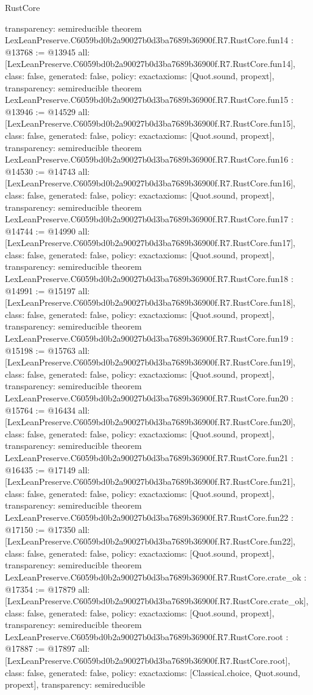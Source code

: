 \begin{lexlean}{RustCore}
\begin{coremodule}
{  transparency: semireducible
}
theorem LexLeanPreserve.C6059bd0b2a90027b0d3ba7689b36900f.R7.RustCore.fun14 : @13768 := @13945 {
  all: [LexLeanPreserve.C6059bd0b2a90027b0d3ba7689b36900f.R7.RustCore.fun14],
  class: false,
  generated: false,
  policy: exact{axioms: [Quot.sound, propext]},
  transparency: semireducible
}
theorem LexLeanPreserve.C6059bd0b2a90027b0d3ba7689b36900f.R7.RustCore.fun15 : @13946 := @14529 {
  all: [LexLeanPreserve.C6059bd0b2a90027b0d3ba7689b36900f.R7.RustCore.fun15],
  class: false,
  generated: false,
  policy: exact{axioms: [Quot.sound, propext]},
  transparency: semireducible
}
theorem LexLeanPreserve.C6059bd0b2a90027b0d3ba7689b36900f.R7.RustCore.fun16 : @14530 := @14743 {
  all: [LexLeanPreserve.C6059bd0b2a90027b0d3ba7689b36900f.R7.RustCore.fun16],
  class: false,
  generated: false,
  policy: exact{axioms: [Quot.sound, propext]},
  transparency: semireducible
}
theorem LexLeanPreserve.C6059bd0b2a90027b0d3ba7689b36900f.R7.RustCore.fun17 : @14744 := @14990 {
  all: [LexLeanPreserve.C6059bd0b2a90027b0d3ba7689b36900f.R7.RustCore.fun17],
  class: false,
  generated: false,
  policy: exact{axioms: [Quot.sound, propext]},
  transparency: semireducible
}
theorem LexLeanPreserve.C6059bd0b2a90027b0d3ba7689b36900f.R7.RustCore.fun18 : @14991 := @15197 {
  all: [LexLeanPreserve.C6059bd0b2a90027b0d3ba7689b36900f.R7.RustCore.fun18],
  class: false,
  generated: false,
  policy: exact{axioms: [Quot.sound, propext]},
  transparency: semireducible
}
theorem LexLeanPreserve.C6059bd0b2a90027b0d3ba7689b36900f.R7.RustCore.fun19 : @15198 := @15763 {
  all: [LexLeanPreserve.C6059bd0b2a90027b0d3ba7689b36900f.R7.RustCore.fun19],
  class: false,
  generated: false,
  policy: exact{axioms: [Quot.sound, propext]},
  transparency: semireducible
}
theorem LexLeanPreserve.C6059bd0b2a90027b0d3ba7689b36900f.R7.RustCore.fun20 : @15764 := @16434 {
  all: [LexLeanPreserve.C6059bd0b2a90027b0d3ba7689b36900f.R7.RustCore.fun20],
  class: false,
  generated: false,
  policy: exact{axioms: [Quot.sound, propext]},
  transparency: semireducible
}
theorem LexLeanPreserve.C6059bd0b2a90027b0d3ba7689b36900f.R7.RustCore.fun21 : @16435 := @17149 {
  all: [LexLeanPreserve.C6059bd0b2a90027b0d3ba7689b36900f.R7.RustCore.fun21],
  class: false,
  generated: false,
  policy: exact{axioms: [Quot.sound, propext]},
  transparency: semireducible
}
theorem LexLeanPreserve.C6059bd0b2a90027b0d3ba7689b36900f.R7.RustCore.fun22 : @17150 := @17350 {
  all: [LexLeanPreserve.C6059bd0b2a90027b0d3ba7689b36900f.R7.RustCore.fun22],
  class: false,
  generated: false,
  policy: exact{axioms: [Quot.sound, propext]},
  transparency: semireducible
}
theorem LexLeanPreserve.C6059bd0b2a90027b0d3ba7689b36900f.R7.RustCore.crate_ok : @17354 := @17879 {
  all: [LexLeanPreserve.C6059bd0b2a90027b0d3ba7689b36900f.R7.RustCore.crate_ok],
  class: false,
  generated: false,
  policy: exact{axioms: [Quot.sound, propext]},
  transparency: semireducible
}
theorem LexLeanPreserve.C6059bd0b2a90027b0d3ba7689b36900f.R7.RustCore.root : @17887 := @17897 {
  all: [LexLeanPreserve.C6059bd0b2a90027b0d3ba7689b36900f.R7.RustCore.root],
  class: false,
  generated: false,
  policy: exact{axioms: [Classical.choice, Quot.sound, propext]},
  transparency: semireducible
}


\end{coremodule}
\end{lexlean}
